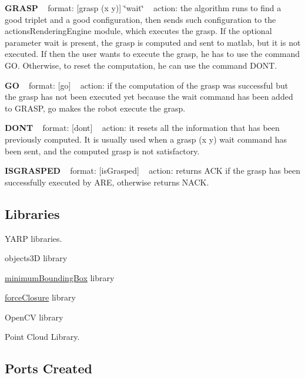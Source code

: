 {\bfseries G\+R\+A\+S\+P} ~\newline
format\+: \mbox{[}grasp (x y)\mbox{]} \char`\"{}wait\char`\"{} ~\newline
action\+: the algorithm runs to find a good triplet and a good configuration, then sends such configuration to the actions\+Rendering\+Engine module, which executes the grasp. If the optional parameter wait is present, the grasp is computed and sent to matlab, but it is not executed. If then the user wants to execute the grasp, he has to use the command G\+O. Otherwise, to reset the computation, he can use the command D\+O\+N\+T.

{\bfseries G\+O} ~\newline
format\+: \mbox{[}go\mbox{]} ~\newline
action\+: if the computation of the grasp was successful but the grasp has not been executed yet because the wait command has been added to G\+R\+A\+S\+P, go makes the robot execute the grasp.

{\bfseries D\+O\+N\+T} ~\newline
format\+: \mbox{[}dont\mbox{]} ~\newline
action\+: it resets all the information that has been previously computed. It is usually used when a grasp (x y) wait command has been sent, and the computed grasp is not satisfactory.

{\bfseries I\+S\+G\+R\+A\+S\+P\+E\+D} ~\newline
format\+: \mbox{[}is\+Grasped\mbox{]} ~\newline
action\+: returns A\+C\+K if the grasp has been successfully executed by A\+R\+E, otherwise returns N\+A\+C\+K.\hypertarget{group__handIKModule_lib_sec}{}\subsection{Libraries}\label{group__handIKModule_lib_sec}

\begin{DoxyItemize}
\item Y\+A\+R\+P libraries.
\item objects3\+D library
\item \hyperlink{group__minimumBoundingBox}{minimum\+Bounding\+Box} library
\item \hyperlink{group__forceClosure}{force\+Closure} library
\item Open\+C\+V library
\item Point Cloud Library.
\end{DoxyItemize}\hypertarget{group__handIKModule_portsc_sec}{}\subsection{Ports Created}\label{group__handIKModule_portsc_sec}

